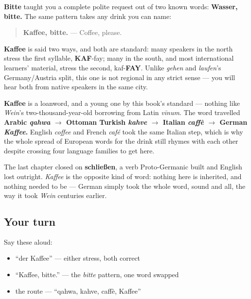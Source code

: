 \textbf{Bitte} taught you a complete polite request out of two known words: \textbf{Wasser, bitte.} The same pattern takes any drink you can name:

\begin{quote}
\textbf{Kaffee, bitte.} — Coffee, please.
\end{quote}

\begin{sounds}
\textbf{Kaffee} is said two ways, and both are standard: many speakers in the north stress the first syllable, \textbf{KAF}-fay; many in the south, and most international learners' material, stress the second, kaf-\textbf{FAY}. Unlike \emph{gehen} and \emph{laufen}'s Germany/Austria split, this one is not regional in any strict sense — you will hear both from native speakers in the same city.
\end{sounds}

\begin{cousinweb}
\textbf{Kaffee} is a loanword, and a young one by this book's standard — nothing like \emph{Wein}'s two-thousand-year-old borrowing from Latin \emph{vīnum}. The word travelled \textbf{Arabic \emph{qahwa} $\to$ Ottoman Turkish \emph{kahve} $\to$ Italian \emph{caffè} $\to$ German \emph{Kaffee}.} English \emph{coffee} and French \emph{café} took the same Italian step, which is why the whole spread of European words for the drink still rhymes with each other despite crossing four language families to get here.

The last chapter closed on \textbf{schließen}, a verb Proto-Germanic built and English lost outright. \emph{Kaffee} is the opposite kind of word: nothing here is inherited, and nothing needed to be — German simply took the whole word, sound and all, the way it took \emph{Wein} centuries earlier.
\end{cousinweb}

\subsection*{Your turn}
Say these aloud:

\begin{itemize}
\raggedright
  \item \textquotedblleft{}der Kaffee\textquotedblright{} — either stress, both correct
  \item \textquotedblleft{}Kaffee, bitte.\textquotedblright{} — the \emph{bitte} pattern, one word swapped
  \item the route — \textquotedblleft{}qahwa, kahve, caffè, Kaffee\textquotedblright{}
\end{itemize}

